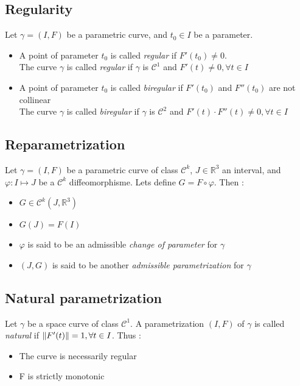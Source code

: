 \subsection{Regularity}
Let $\gamma=(I,F)$ be a parametric curve, and $t_0 \in I$ be a parameter.
\begin{itemize}
	\item A point of parameter $t_0$ is called \emph{regular} if $F'(t_0) \neq 0$.
	\\The curve $\gamma$ is called \emph{regular} if $\gamma$ is $\mathcal{C}^{1}$ and $F'(t) \neq 0, \forall t \in I$
	\item A point of parameter $t_0$ is called \emph{biregular} if $F'(t_0)$ and $F''(t_0)$ are not collinear
	\\The curve $\gamma$ is called \emph{biregular} if $\gamma$ is $\mathcal{C}^{2}$ and  $F'(t)\cdot    F''(t) \neq 0, \forall t \in I$
\end{itemize}

\subsection{Reparametrization}
Let $\gamma=(I,F)$ be a parametric curve of class ${\mathcal{C}}^{k}$, $J \in {\mathbb{R}}^{3}$ an interval, and $\varphi\colon I\mapsto J$ be a ${\mathcal{C}}^{k}$ diffeomorphisme. Lets define $G=F\circ\varphi$. Then :
\begin{itemize}
	\item $G\in{\mathcal{C}}^{k}(J,{\mathbb{R}}^3)$
	\item $G(J)=F(I)$
	\item $\varphi$ is said to be an admissible \emph{change of parameter} for $\gamma$
	\item  $(J,G)$ is said to be another \emph{admissible parametrization} for $\gamma$
\end{itemize}

\subsection{Natural parametrization}
Let $\gamma$ be a space curve of class ${\mathcal{C}}^{1}$. A parametrization $(I,F)$ of $\gamma$ is called \emph{natural} if $\lVert F'(t)\rVert = 1, \forall t \in I$. Thus :
\begin{itemize}
	\item The curve is necessarily regular
	\item F is strictly monotonic
\end{itemize}

